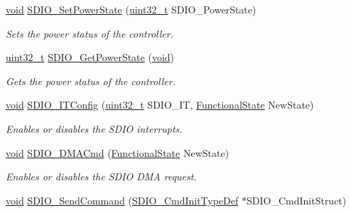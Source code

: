 \begin{DoxyCompactItemize}
\hyperlink{usb__devapi_8h_afabf60e7f57651d6d595a02c75f07cd0}{void} \hyperlink{group___s_d_i_o___exported___functions_ga36ecca32b904de74218fbe65cd5f5270}{S\+D\+I\+O\+\_\+\+Set\+Power\+State} (\hyperlink{_p_e___types_8h_a33594304e786b158f3fb30289278f5af}{uint32\+\_\+t} S\+D\+I\+O\+\_\+\+Power\+State)
\begin{DoxyCompactList}\small\item\em Sets the power status of the controller. \end{DoxyCompactList}\item 
\hyperlink{_p_e___types_8h_a33594304e786b158f3fb30289278f5af}{uint32\+\_\+t} \hyperlink{group___s_d_i_o___exported___functions_ga3a19de2c7cd51645702213f64a1758ed}{S\+D\+I\+O\+\_\+\+Get\+Power\+State} (\hyperlink{usb__devapi_8h_afabf60e7f57651d6d595a02c75f07cd0}{void})
\begin{DoxyCompactList}\small\item\em Gets the power status of the controller. \end{DoxyCompactList}\item 
\hyperlink{usb__devapi_8h_afabf60e7f57651d6d595a02c75f07cd0}{void} \hyperlink{group___s_d_i_o___exported___functions_ga208f51237ef43288735829dbaed37f00}{S\+D\+I\+O\+\_\+\+I\+T\+Config} (\hyperlink{_p_e___types_8h_a33594304e786b158f3fb30289278f5af}{uint32\+\_\+t} S\+D\+I\+O\+\_\+\+IT, \hyperlink{agilefox_2library_2inc_2stm32f10x__type_8h_ac9a7e9a35d2513ec15c3b537aaa4fba1}{Functional\+State} New\+State)
\begin{DoxyCompactList}\small\item\em Enables or disables the S\+D\+IO interrupts. \end{DoxyCompactList}\item 
\hyperlink{usb__devapi_8h_afabf60e7f57651d6d595a02c75f07cd0}{void} \hyperlink{group___s_d_i_o___exported___functions_gad36fde5ec0ce0c2089b9d971c2271e6e}{S\+D\+I\+O\+\_\+\+D\+M\+A\+Cmd} (\hyperlink{agilefox_2library_2inc_2stm32f10x__type_8h_ac9a7e9a35d2513ec15c3b537aaa4fba1}{Functional\+State} New\+State)
\begin{DoxyCompactList}\small\item\em Enables or disables the S\+D\+IO D\+MA request. \end{DoxyCompactList}\item 
\hyperlink{usb__devapi_8h_afabf60e7f57651d6d595a02c75f07cd0}{void} \hyperlink{group___s_d_i_o___exported___functions_ga7117d2f702703f6c0a66bc07707cab23}{S\+D\+I\+O\+\_\+\+Send\+Command} (\hyperlink{struct_s_d_i_o___cmd_init_type_def}{S\+D\+I\+O\+\_\+\+Cmd\+Init\+Type\+Def} $\ast$S\+D\+I\+O\+\_\+\+Cmd\+Init\+Struct)

\end{DoxyCompactItemize}
